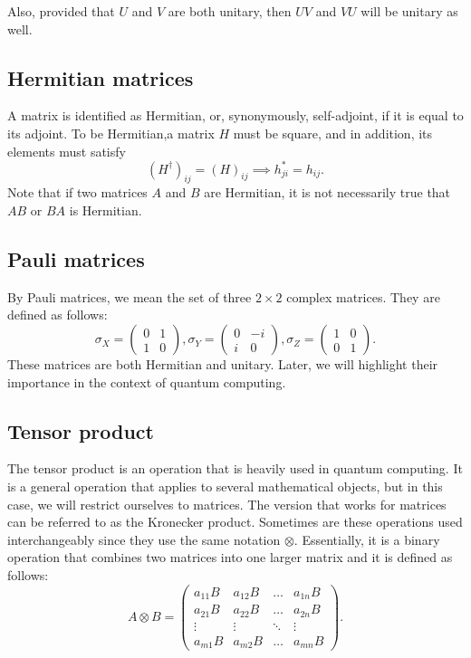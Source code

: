 Also, provided that $U$ and $V$ are both unitary, then $UV$ and $VU$ will be unitary as well.

\subsection{Hermitian matrices}
A matrix is identified as Hermitian, or, synonymously, self-adjoint, if it is equal to its adjoint. To be Hermitian,a matrix $H$ must be square, and in addition, its elements must satisfy $$(H^{\dag})_{ij} = (H)_{ij} \implies h^{*}_{ji} = h_{ij}.$$ Note that if two matrices $A$ and $B$ are Hermitian, it is not necessarily true that $AB$ or $BA$ is Hermitian.

\subsection{Pauli matrices}
By Pauli matrices, we mean the set of three $2 \times 2$ complex matrices. They are defined as follows:
$$\sigma_X = \begin{pmatrix}
    0 & 1 \\
    1 & 0
\end{pmatrix}, \sigma_Y = \begin{pmatrix}
    0 & -i \\
    i & 0
\end{pmatrix}, \sigma_Z = \begin{pmatrix}
    1 & 0 \\
    0 & 1
\end{pmatrix}\text{.}$$ 
These matrices are both Hermitian and unitary. Later, we will highlight their importance in the context of quantum computing.

\subsection{Tensor product}
The tensor product is an operation that is heavily used in quantum computing. It is a general operation that applies to several mathematical objects, but in this case, we will restrict ourselves to matrices. The version that works for matrices can be referred to as the Kronecker product. Sometimes are these operations used interchangeably since they use the same notation $\otimes$. Essentially, it is a binary operation that combines two matrices into one larger matrix and it is defined as follows:
$$A \otimes B = \begin{pmatrix}
    a_{11}B & a_{12}B & \hdots & a_{1n}B \\
    a_{21}B & a_{22}B & \hdots & a_{2n}B \\
    \vdots & \vdots & \ddots & \vdots \\
    a_{m1}B & a_{m2}B & \hdots & a_{mn}B
\end{pmatrix}.$$

